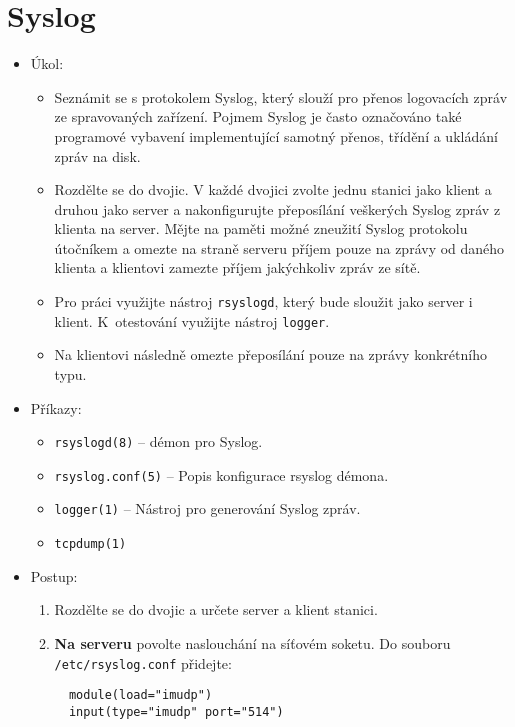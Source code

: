 \section{Syslog}
  \begin{itemize}
    \item Úkol: 
    \begin{itemize}
      \item Seznámit se s protokolem Syslog, který slouží pro přenos
      logovacích zpráv ze spravovaných zařízení. Pojmem Syslog je často označováno také
      programové vybavení implementující samotný přenos, třídění a ukládání zpráv na disk.
      \item Rozdělte se do dvojic. V každé dvojici zvolte jednu stanici jako klient a
      druhou jako server a nakonfigurujte přeposílání veškerých Syslog zpráv 
      z klienta na server. Mějte na paměti možné zneužití Syslog protokolu útočníkem a omezte
      na straně serveru příjem pouze na zprávy od daného klienta
      a klientovi zamezte příjem jakýchkoliv zpráv ze sítě.
      \item Pro práci využijte nástroj {\tt rsyslogd}, který bude sloužit jako server i klient.
      K~otestování využijte nástroj {\tt logger}.
      \item Na klientovi následně omezte přeposílání pouze na zprávy konkrétního typu.
    \end{itemize}
    \item Příkazy:
       \begin{itemize}
            \item {\tt rsyslogd(8)} -- démon pro Syslog.
            \item {\tt rsyslog.conf(5)} -- Popis konfigurace rsyslog démona.
            \item {\tt logger(1)} -- Nástroj pro generování Syslog zpráv.
            \item {\tt tcpdump(1)}
        \end{itemize}
    \item Postup:
       \begin{enumerate}
            \item Rozdělte se do dvojic a určete server a klient stanici.

            \item {\bf Na serveru} povolte naslouchání na síťovém soketu. Do souboru {\tt /etc/rsyslog.conf} přidejte:
\begin{verbatim}
  module(load="imudp")
  input(type="imudp" port="514")
\end{verbatim}


\end{enumerate}
\end{itemize}
